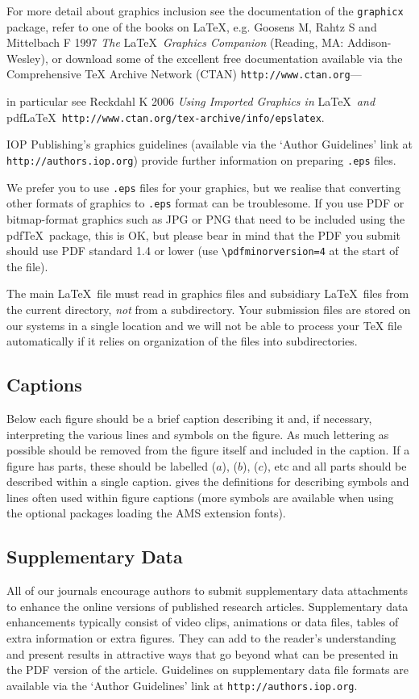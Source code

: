 \documentclass[12pt]{iopart}
\begin{document}
For more detail about graphics inclusion see the documentation 
of the \verb"graphicx" package, refer to one of the books on \LaTeX , e.g. Goosens M, Rahtz S and Mittelbach F 1997 {\it The }\LaTeX\ {\it Graphics Companion\/} 
(Reading, MA: Addison-Wesley),
or download some of the excellent free documentation available via the Comprehensive
TeX Archive Network (CTAN) \verb"http://www.ctan.org"---{in particular see Reckdahl K 2006 {\it Using Imported Graphics in }\LaTeX\ {\it and }pdf\LaTeX\ \verb"http://www.ctan.org/tex-archive/info/epslatex".

IOP Publishing's graphics guidelines (available via the `Author Guidelines' link at \verb"http://authors.iop.org") provide further information on preparing \verb".eps" files.

We prefer you to use \verb".eps" files for your graphics, but we realise that converting other
formats of graphics to \verb".eps" format can be troublesome.  If you use PDF or bitmap-format graphics
such as JPG or PNG that need to be included using the pdf\TeX\ package, this is OK, but please bear
in mind that the PDF you submit should use PDF standard 1.4 or lower (use \verb"\pdfminorversion=4" at the
start of the file).

The main \LaTeX\ file must read in graphics files and subsidiary \LaTeX\ files from the current directory,
{\it not} from a subdirectory.  Your submission files are stored on our systems in a single location and we will not be able to process your
TeX file automatically if it relies on organization of the files into subdirectories.

\subsection{Captions}
Below each figure should be a brief caption describing it and, if 
necessary, interpreting the various lines and symbols on the figure. 
As much lettering as possible should be removed from the figure itself 
and included in the caption. If a figure has parts, these should be 
labelled ($a$), ($b$), ($c$), etc and all parts should be described 
within a single caption.  gives the definitions for describing 
symbols and lines often used within figure captions (more symbols are 
available when using the optional packages loading the AMS extension fonts).

\subsection{Supplementary Data}
All of our journals encourage authors to submit supplementary data attachments to 
enhance the online versions of published research articles. Supplementary data 
enhancements typically consist of video clips, animations or
data files, tables of extra information or extra figures. They can 
add to the reader's understanding and present results in attractive ways that go 
beyond what can be presented in the PDF version of the article. 
Guidelines on supplementary data file formats 
are available via the `Author Guidelines' link at \verb"http://authors.iop.org".

}
\end{document}
